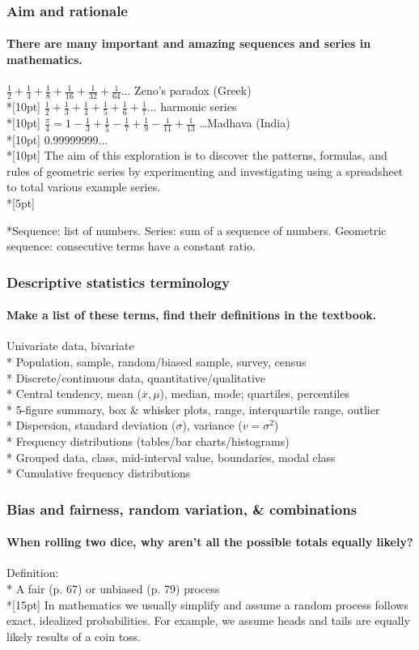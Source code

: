 \documentclass{beamer}
\begin{document}
\frame
{
  \frametitle{Aim and rationale}
  \framesubtitle{There are many important and amazing sequences and series in mathematics.}
  $\displaystyle \frac{1}{2}+\frac{1}{4}+\frac{1}{8}+\frac{1}{16}+\frac{1}{32}+\frac{1}{64} \dots$ Zeno's paradox (Greek)\\*[10pt]  $\displaystyle \frac{1}{2}+\frac{1}{3}+\frac{1}{4}+\frac{1}{5}+\frac{1}{6}+\frac{1}{7} \dots$ harmonic series\\*[10pt]
  $\displaystyle \frac{\pi}{4}=1-\frac{1}{3}+\frac{1}{5}-\frac{1}{7}+\frac{1}{9}-\frac{1}{11}+\frac{1}{13}$ \dots Madhava  (India)\\*[10pt]
  0.99999999...\\*[10pt]
The aim of this exploration is to discover the patterns, formulas, and rules of geometric series by experimenting and investigating using a spreadsheet to total various example series.\\*[5pt]
  
*Sequence: list of numbers. Series: sum of a sequence of numbers. Geometric sequence: consecutive terms have a constant ratio.
}

\frame
{
  \frametitle{Descriptive statistics terminology}
  \framesubtitle{Make a list of these terms, find their definitions in the textbook.}
  
  Univariate data, bivariate\\*
  Population, sample, random/biased sample, survey, census\\*
  Discrete/continuous data, quantitative/qualitative\\* 
  Central tendency, mean ($\overline{x}, \mu$), median, mode; quartiles, percentiles\\*
  5-figure summary, box \& whisker plots, range, interquartile range, outlier\\*
  Dispersion, standard deviation ($\sigma$), variance ($v=\sigma^2$)\\*
  Frequency distributions (tables/bar charts/histograms)\\*
  Grouped data, class, mid-interval value, boundaries, modal class\\*
  Cumulative frequency distributions

  
}

\frame
{
  \frametitle{Bias and fairness, random variation, \& combinations}
  \framesubtitle{When rolling two dice, why aren't all the possible totals equally likely?}
  Definition:\\*
  A \alert{fair} (p. 67) or \alert{unbiased} (p. 79) process \\*[15pt]
  In mathematics we usually simplify and assume a random process follows exact, idealized probabilities. For example, we assume heads and tails are equally likely results of a coin toss.
  
}
\end{document}
